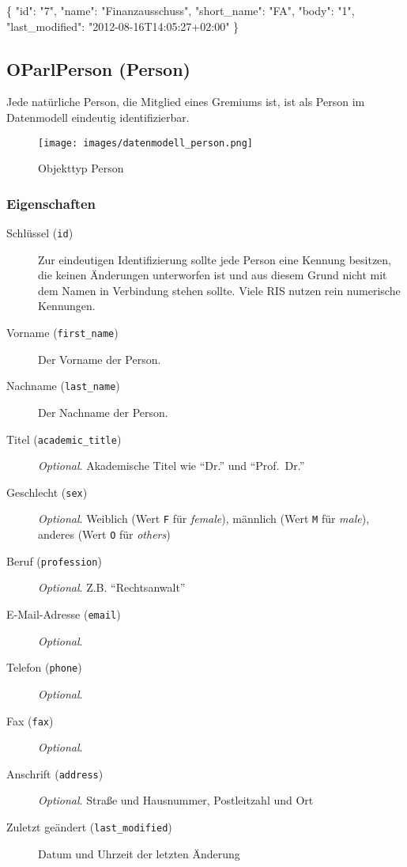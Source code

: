 \documentclass[,a4paper]{article}
\makeatletter
\newenvironment{Shaded}{}{}
\newcommand{\DataTypeTok}[1]{\textcolor[rgb]{0.56,0.13,0.00}{{#1}}}
\newcommand{\StringTok}[1]{\textcolor[rgb]{0.25,0.44,0.63}{{#1}}}
\newcommand{\NormalTok}[1]{{#1}}
\def\maxwidth{\ifdim\Gin@nat@width>\linewidth\linewidth
\else\Gin@nat@width\fi}
\let\Oldincludegraphics\includegraphics
\renewcommand{\includegraphics}[1]{\Oldincludegraphics[width=\maxwidth]{#1}}
\makeatother
\begin{document}
\begin{Shaded}
\begin{Highlighting}[]
\NormalTok{\{}
    \DataTypeTok{"id"}\NormalTok{: }\StringTok{"7"}\NormalTok{,}
    \DataTypeTok{"name"}\NormalTok{: }\StringTok{"Finanzausschuss"}\NormalTok{,}
    \DataTypeTok{"short_name"}\NormalTok{: }\StringTok{"FA"}\NormalTok{,}
    \DataTypeTok{"body"}\NormalTok{: }\StringTok{"1"}\NormalTok{,}
    \DataTypeTok{"last_modified"}\NormalTok{: }\StringTok{"2012-08-16T14:05:27+02:00"}
\NormalTok{\}}
\end{Highlighting}
\end{Shaded}

\subsection{OParlPerson (Person)}

Jede natürliche Person, die Mitglied eines Gremiums ist, ist als Person
im Datenmodell eindeutig identifizierbar.

\begin{figure}[htbp]
\centering
\texttt{[image: images/datenmodell\_person.png]}
\caption{Objekttyp Person}
\end{figure}

\subsubsection{Eigenschaften}

\begin{description}
\item[Schlüssel (\texttt{id})]
Zur eindeutigen Identifizierung sollte jede Person eine Kennung
besitzen, die keinen Änderungen unterworfen ist und aus diesem Grund
nicht mit dem Namen in Verbindung stehen sollte. Viele RIS nutzen rein
numerische Kennungen.
\item[Vorname (\texttt{first\_name})]
Der Vorname der Person.
\item[Nachname (\texttt{last\_name})]
Der Nachname der Person.
\item[Titel (\texttt{academic\_title})]
\emph{Optional}. Akademische Titel wie ``Dr.'' und ``Prof.~Dr.''
\item[Geschlecht (\texttt{sex})]
\emph{Optional}. Weiblich (Wert \texttt{F} für \emph{female}), männlich
(Wert \texttt{M} für \emph{male}), anderes (Wert \texttt{O} für
\emph{others})
\item[Beruf (\texttt{profession})]
\emph{Optional}. Z.B. ``Rechtsanwalt''
\item[E-Mail-Adresse (\texttt{email})]
\emph{Optional}.
\item[Telefon (\texttt{phone})]
\emph{Optional}.
\item[Fax (\texttt{fax})]
\emph{Optional}.
\item[Anschrift (\texttt{address})]
\emph{Optional}. Straße und Hausnummer, Postleitzahl und Ort
\item[Zuletzt geändert (\texttt{last\_modified})]
Datum und Uhrzeit der letzten Änderung
\end{description}
\end{document}
